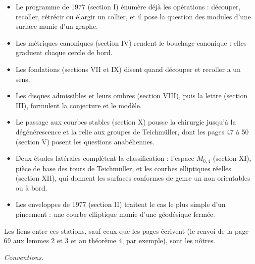 \documentclass[11pt,a4paper]{article}
\begin{document}
\begin{itemize}
  \item Le programme de 1977 (section I) énumère déjà les opérations :
  découper, recoller, rétrécir ou élargir un collier, et il pose la question
  des modules d'une surface munie d'un graphe.
  \item Les métriques canoniques (section IV) rendent le bouchage canonique :
  elles graduent chaque cercle de bord.
  \item Les fondations (sections VII et IX) disent quand découper et recoller
  a un sens.
  \item Les disques admissibles et leurs ombres (section VIII), puis la
  lettre (section III), formulent la conjecture et le modèle.
  \item Le passage aux courbes stables (section X) pousse la chirurgie
  jusqu'à la dégénérescence et la relie aux groupes de Teichmüller, dont les
  pages 47 à 50 (section V) posent les questions anabéliennes.
  \item Deux études latérales complètent la classification : l'espace
  $M_{0,4}$ (section XI), pièce de base des tours de Teichmüller, et les
  courbes elliptiques réelles (section XII), qui donnent les surfaces
  conformes de genre un non orientables ou à bord.
  \item Les enveloppes de 1977 (section II) traitent le cas le plus simple
  d'un pincement : une courbe elliptique munie d'une géodésique fermée.
\end{itemize}

Les liens entre ces stations, sauf ceux que les pages écrivent (le renvoi de
la page 69 aux lemmes 2 et 3 et au théorème 4, par exemple), sont les nôtres.

\emph{Conventions.}
\end{document}
